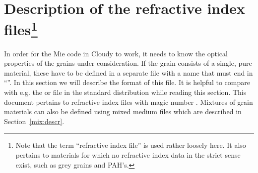 \section[Description of the refractive index files]
{Description of the refractive index files\protect\footnote{Note that the
term ``refractive index file'' is used rather loosely here. It also pertains
to materials for which no refractive index data in the strict sense exist,
such as grey grains and PAH's.}}
\label{rfi:descr}

In order for the Mie code in Cloudy to work, it needs to know the optical
properties of the grains under consideration. If the grain consists of a
single, pure material, these have to be defined in a separate file with a name
that must end in ``''. In this section we will describe the
format of this file. It is helpful to compare with e.g. the
 or  file in the standard
distribution while reading this section. This document pertains to refractive
index files with magic number . Mixtures of grain
materials can also be defined using mixed medium files which are described in
Section~\ref{mix:descr}.

